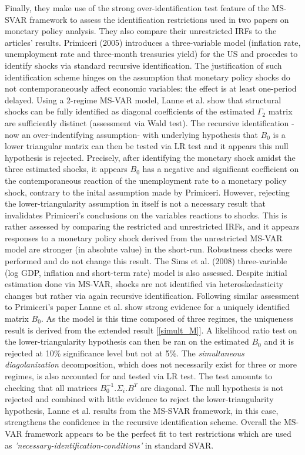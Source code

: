 Finally, they make use of the strong over-identification test feature of the MS-SVAR framework to assess the identification restrictions used in two papers on monetary policy analysis. 
They also compare their unrestricted IRFs to the articles' results. 
Primiceri (2005) introduces a three-variable model (inflation rate, unemployment rate and three-month treasuries yield) for the US and procedes to identify shocks via standard recursive identification. 
The justification of such identification scheme hinges on the assumption that monetary policy shocks do not contemporaneously affect economic variables: the effect is at least one-period delayed.
Using a 2-regime MS-VAR model, Lanne et al. show that structural shocks can be fully identified as diagonal coefficients of the estimated $\Gamma_2$ matrix are sufficiently distinct (assessment via Wald test). 
The recursive identification -now an over-indentifying assumption- with underlying hypothesis that $B_0$ is a lower triangular matrix can then be tested via LR test and it appears this null hypothesis is rejected. 
Precisely, after identifying the monetary shock amidst the three estimated shocks, it appears $B_0$ has a negative and significant coefficient on the contemporaneous reaction of the unemployment rate to a monetary policy shock, contrary to the inital assumption made by Primiceri.
However, rejecting the lower-triangularity assumption in itself is not a necessary result that invalidates Primiceri's conclusions on the variables reactions to shocks. 
This is rather assessed by comparing the restricted and unrestricted IRFs, and it appears responses to a monetary policy shock derived from the unrestricted MS-VAR model are stronger (in absolute value) in the short-run. Robustness checks were performed and do not change this result.
\bigbreak
The Sims et al. (2008) three-variable (log GDP, inflation and short-term rate) model is also assessed. 
Despite initial estimation done via MS-VAR, shocks are not identified via heteroskedasticity changes but rather via again recursive identification.
Following similar assessment to Primiceri's paper Lanne et al. show strong evidence for a uniquely identified matrix $B_0$. 
As the model is this time composed of three regimes, the uniqueness result is derived from the extended result [\ref{simult_M}].
A likelihood ratio test on the lower-triangularity hypothesis can then be ran on the estimated $B_0$ and it is rejected at 10\% significance level but not at 5\%.
The \textit{simultaneous diagolanization} decomposition, which does not necessarily exist for three or more regimes, is also accounted for and tested via LR test.
The test amounts to checking that all matrices $B_0^{-1}.\Sigma_i.B^T$ are diagonal\footnotemark.
The null hypothesis is not rejected and combined with little evidence to reject the lower-triangularity hypothesis, Lanne et al. results from the MS-SVAR framework, in this case, strengthens the confidence in the recursive identification scheme.
Overall the MS-VAR framework appears to be the perfect fit to test restrictions which are used as \textit{'necessary-identification-conditions'} in standard SVAR.

